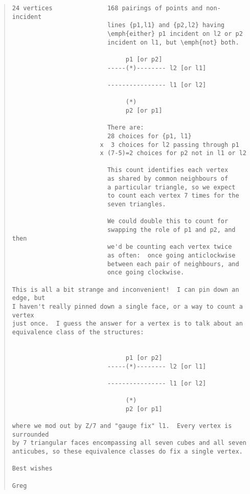 \begin{quote}
\begin{verbatim}
24 vertices               168 pairings of points and non-incident
                          lines {p1,l1} and {p2,l2} having
                          \emph{either} p1 incident on l2 or p2
                          incident on l1, but \emph{not} both.

                               p1 [or p2]
                          -----(*)-------- l2 [or l1]

                          ---------------- l1 [or l2]

                               (*)
                               p2 [or p1]

                          There are:
                          28 choices for {p1, l1}
                        x  3 choices for l2 passing through p1
                        x (7-5)=2 choices for p2 not in l1 or l2

                          This count identifies each vertex
                          as shared by common neighbours of
                          a particular triangle, so we expect
                          to count each vertex 7 times for the
                          seven triangles.

                          We could double this to count for
                          swapping the role of p1 and p2, and then
                          we'd be counting each vertex twice
                          as often:  once going anticlockwise
                          between each pair of neighbours, and
                          once going clockwise.

This is all a bit strange and inconvenient!  I can pin down an edge, but 
I haven't really pinned down a single face, or a way to count a vertex 
just once.  I guess the answer for a vertex is to talk about an 
equivalence class of the structures:


                               p1 [or p2]
                          -----(*)-------- l2 [or l1]

                          ---------------- l1 [or l2]

                               (*)
                               p2 [or p1]

where we mod out by Z/7 and "gauge fix" l1.  Every vertex is surrounded 
by 7 triangular faces encompassing all seven cubes and all seven 
anticubes, so these equivalence classes do fix a single vertex.

Best wishes

Greg
\end{verbatim}
    
\end{quote}



